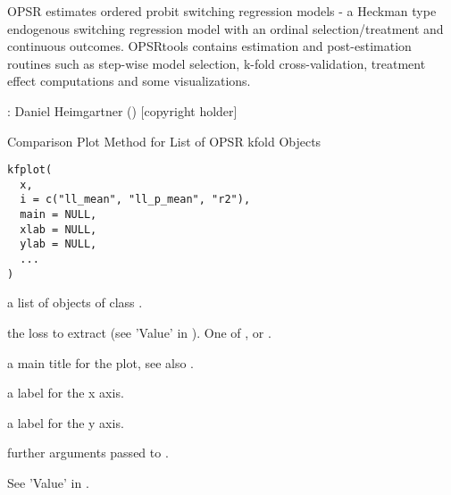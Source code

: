 
%
\begin{Description}
OPSR estimates ordered probit switching regression models - a Heckman type endogenous switching regression model with an ordinal selection/treatment and continuous outcomes. OPSRtools contains estimation and post-estimation routines such as step-wise model selection, k-fold cross-validation, treatment effect computations and some visualizations.
\end{Description}
%
\begin{Author}
: Daniel Heimgartner  () [copyright holder]

\end{Author}


%
\begin{Description}
Comparison Plot Method for List of OPSR kfold Objects
\end{Description}
%
\begin{Usage}
\begin{verbatim}
kfplot(
  x,
  i = c("ll_mean", "ll_p_mean", "r2"),
  main = NULL,
  xlab = NULL,
  ylab = NULL,
  ...
)
\end{verbatim}
\end{Usage}
%
\begin{Arguments}
\begin{ldescription}
\item[\code{x}] a list of objects of class .

\item[\code{i}] the loss to extract (see 'Value' in ). One of ,
 or .

\item[\code{main}] a main title for the plot, see also .

\item[\code{xlab}] a label for the x axis.

\item[\code{ylab}] a label for the y axis.

\item[\code{...}] further arguments passed to .
\end{ldescription}
\end{Arguments}
%
\begin{Value}
See 'Value' in .
\end{Value}
%
\begin{SeeAlso}
\end{SeeAlso}

